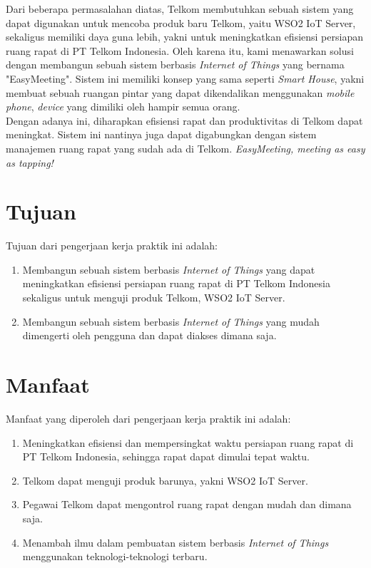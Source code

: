 \tab Dari beberapa permasalahan diatas, Telkom membutuhkan sebuah sistem yang dapat digunakan untuk mencoba produk baru Telkom, yaitu WSO2 IoT Server, sekaligus memiliki daya guna lebih, yakni untuk meningkatkan efisiensi persiapan ruang rapat di PT Telkom Indonesia. Oleh karena itu, kami menawarkan solusi dengan membangun sebuah sistem berbasis \textit{Internet of Things} yang bernama "EasyMeeting". Sistem ini memiliki konsep yang sama seperti \textit{Smart House}, yakni membuat sebuah ruangan pintar yang dapat dikendalikan menggunakan \textit{mobile phone}, \textit{device} yang dimiliki oleh hampir semua orang. \\
\tab Dengan adanya \namaSistem ini, diharapkan efisiensi rapat dan produktivitas di Telkom dapat meningkat. Sistem ini nantinya juga dapat digabungkan dengan sistem manajemen ruang rapat yang sudah ada di Telkom. \textit{EasyMeeting, meeting as easy as tapping!}  

\section{Tujuan}
\tab Tujuan dari pengerjaan kerja praktik ini adalah:
\begin{enumerate}
	\item Membangun sebuah sistem berbasis \textit{Internet of Things} yang dapat meningkatkan efisiensi persiapan ruang rapat di PT Telkom Indonesia sekaligus untuk menguji produk Telkom, WSO2 IoT Server.
	\item Membangun sebuah sistem berbasis \textit{Internet of Things} yang mudah dimengerti oleh pengguna dan dapat diakses dimana saja.
\end{enumerate}

\section{Manfaat}
\tab Manfaat yang diperoleh dari pengerjaan kerja praktik ini adalah:
\begin{enumerate}
	\item Meningkatkan efisiensi dan mempersingkat waktu persiapan ruang rapat di PT Telkom Indonesia, sehingga rapat dapat dimulai tepat waktu.
	\item Telkom dapat menguji produk barunya, yakni WSO2 IoT Server.
	\item Pegawai Telkom dapat mengontrol ruang rapat dengan mudah dan dimana saja.
	\item Menambah ilmu dalam pembuatan sistem berbasis \textit{Internet of Things} menggunakan teknologi-teknologi terbaru.
\end{enumerate}

